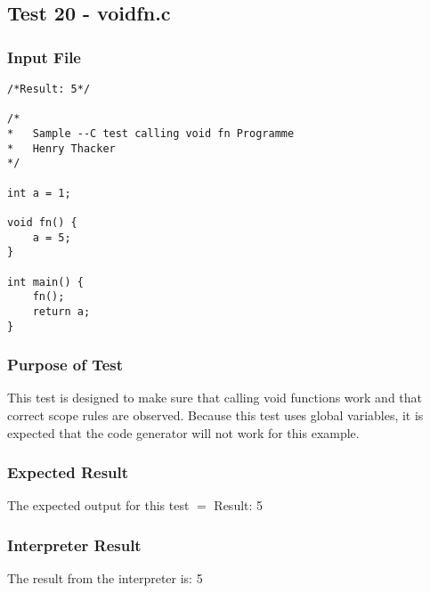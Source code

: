 \subsection{Test 20 - voidfn.c}
\subsubsection{Input File}
\begin{lstlisting}[showstringspaces=false,breaklines=true,backgroundcolor=\color{light-gray}, captionpos=b]
/*Result: 5*/

/*
*	Sample --C test calling void fn Programme
*	Henry Thacker
*/

int a = 1;

void fn() {
	a = 5;
}

int main() {
	fn();
	return a;
}
\end{lstlisting}\subsubsection{Purpose of Test}
This test is designed to make sure that calling void functions work and that correct scope rules are observed. Because this test uses global variables, it is expected that the code generator will not work for this example.

\subsubsection{Expected Result}
The expected output for this test $=$ Result: 5
\subsubsection{Interpreter Result}
The result from the interpreter is: 5
